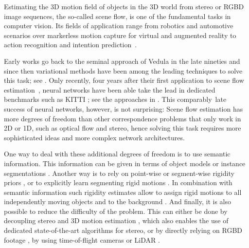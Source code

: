 \documentclass[10pt,twocolumn,letterpaper]{article}
\begin{document}
Estimating the 3D motion field of objects in the 3D world
from stereo or RGBD image sequences, 
the so-called scene flow, is one of the fundamental tasks in computer vision. Its fields of application range from robotics and automotive scenarios \cite{Menze2015_KITTI} over markerless motion capture for virtual and augmented reality
\cite{Valgaerts2012_PerformanceCapture} to action recognition and intention prediction~\cite{Wang2017_ActionReg}. 

Early works go back to the seminal approach of Vedula \etal \cite{Vedula1999_SceneFlow} in the late nineties and since then variational methods have been among the leading techniques to solve this task; see \eg \cite{Devernay2007_SceneFlow,Vogel2015_PRSM,Wedel2011_SceneFlow}.
Only recently, four years after 
their first application to scene flow estimation~\cite{Mayer2016_SceneFlow},
neural networks have been able take the lead in dedicated benchmarks such as KITTI \cite{Menze2015_KITTI}; see \eg the approaches in  \cite{Liu2022_camliflow,Teed2021_RAFT3D,Yang2020_opticalexpansion,Yang2021_SegmentRigid}.
This comparably~late success of neural networks, however,
is not surprising:
Scene flow estimation has more degrees of freedom than other correspondence problems that only work in 2D or 1D, such as optical flow and stereo,
hence solving this task requires more sophisticated ideas and more complex network architectures. 

One way to deal with these additional degrees of freedom
is to use semantic information.
This information can be given in terms of object models \cite{Menze2015_KITTI} or instance segmentations \cite{Behl2017_ISF,Ma2019_DRISF,Yang2021_SegmentRigid}.
Another way is to rely on point-wise \cite{Teed2021_RAFT3D} or segment-wise rigidity priors \cite{Golyanik2017_3DV,Ma2019_DRISF,Menze2015_KITTI,Vogel2015_PRSM}, or to explicitly learn segmenting rigid motions \cite{Yang2021_SegmentRigid}.
In combination with semantic information such rigidity estimates allow to assign rigid motions to all independently moving objects and to the background \cite{Ma2019_DRISF,Yang2021_SegmentRigid}.
And finally, it is also possible to reduce the difficulty of the problem.
This can either be done by decoupling stereo and 3D motion estimation \cite{Badki2021_binaryTTC,Liu2022_camliflow,Teed2021_RAFT3D,Wedel2011_SceneFlow,Yang2020_opticalexpansion},
which also enables the use of dedicated state-of-the-art algorithms for stereo, or by directly relying on RGBD footage \cite{Golyanik2017_3DV,Gottfried_RGBDSceneFlow,Qiao2018_RGBDSceneFlow,Quiroga2014_RGBDSceneFlow}, \eg by using time-of-flight cameras or LiDAR \cite{Liu2022_camliflow}. 
\end{document}
